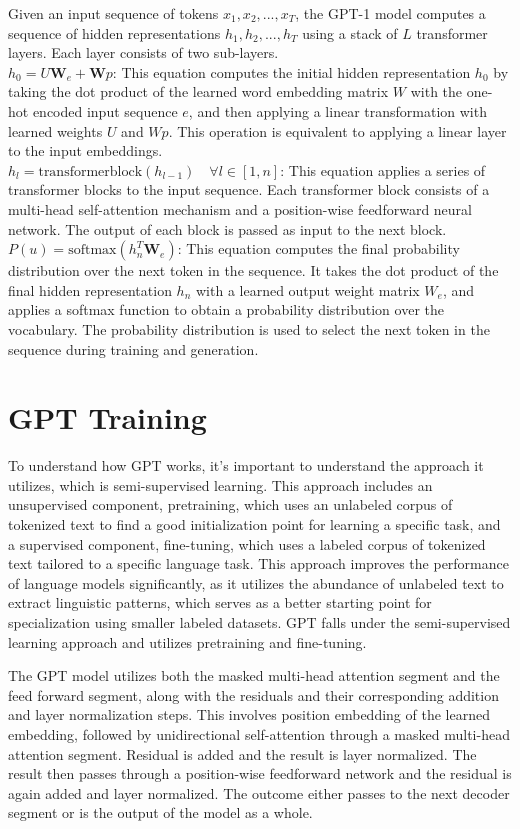 \documentclass[
	11pt,
	a4paper,
	figtabcapt,
]{oblivoir}
\begin{document}
	
Given an input sequence of tokens ${x_1, x_2, ..., x_T}$, the GPT-1 model computes a sequence of hidden representations ${h_1, h_2, ..., h_T}$ using a stack of $L$ transformer layers. Each layer consists of two sub-layers.\\
$h_0 = U \textbf{W}_e + \textbf{W}p $: This equation computes the initial hidden representation $h_0$ by taking the dot product of the learned word embedding matrix $W$ with the one-hot encoded input sequence $e$, and then applying a linear transformation with learned weights $U$ and $Wp$. This operation is equivalent to applying a linear layer to the input embeddings.\\
$h_l = \text{transformerblock}(h_{l-1}) \quad \forall l \in [1, n]$: This equation applies a series of transformer blocks to the input sequence. Each transformer block consists of a multi-head self-attention mechanism and a position-wise feedforward neural network. The output of each block is passed as input to the next block. \\
$P(u) = \text{softmax}(h_n^T \textbf{W}_e)$: This equation computes the final probability distribution over the next token in the sequence. It takes the dot product of the final hidden representation $h_n$ with a learned output weight matrix $W_e$, and applies a softmax function to obtain a probability distribution over the vocabulary. The probability distribution is used to select the next token in the sequence during training and generation.
\section{GPT Training}\label{sec:training}
To understand how GPT works, it's important to understand the approach it utilizes, which is semi-supervised learning.
This approach includes an unsupervised component, pretraining, which uses an unlabeled corpus of tokenized text to find a good initialization point for learning a specific task, and a supervised component, fine-tuning, which uses a labeled corpus of tokenized text tailored to a specific language task.
This approach improves the performance of language models significantly, as it utilizes the abundance of unlabeled text to extract linguistic patterns, which serves as a better starting point for specialization using smaller labeled datasets.
GPT falls under the semi-supervised learning approach and utilizes pretraining and fine-tuning.

The GPT model utilizes both the masked multi-head attention segment and the feed forward segment, along with the residuals and their corresponding addition and layer normalization steps.
This involves position embedding of the learned embedding, followed by unidirectional self-attention through a masked multi-head attention segment. Residual is added and the result is layer normalized. The result then passes through a position-wise feedforward network and the residual is again added and layer normalized.
The outcome either passes to the next decoder segment or is the output of the model as a whole.
\end{document}
